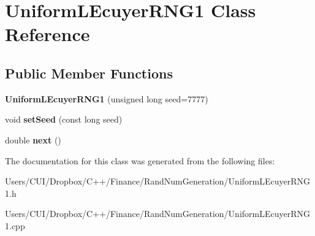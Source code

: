\hypertarget{class_uniform_l_ecuyer_r_n_g1}{}\section{Uniform\+L\+Ecuyer\+R\+N\+G1 Class Reference}
\label{class_uniform_l_ecuyer_r_n_g1}
\subsection*{Public Member Functions}
\begin{DoxyCompactItemize}
\item 
\hypertarget{class_uniform_l_ecuyer_r_n_g1_a337fc3fe276e950c8ef9e330779eedb7}{}\label{class_uniform_l_ecuyer_r_n_g1_a337fc3fe276e950c8ef9e330779eedb7} 
{\bfseries Uniform\+L\+Ecuyer\+R\+N\+G1} (unsigned long seed=7777)
\item 
\hypertarget{class_uniform_l_ecuyer_r_n_g1_a33e1ea51eb633a14e84d45d8c31a4e8b}{}\label{class_uniform_l_ecuyer_r_n_g1_a33e1ea51eb633a14e84d45d8c31a4e8b} 
void {\bfseries set\+Seed} (const long seed)
\item 
\hypertarget{class_uniform_l_ecuyer_r_n_g1_a6a166e0bef412d4c85565ec0017ae489}{}\label{class_uniform_l_ecuyer_r_n_g1_a6a166e0bef412d4c85565ec0017ae489} 
double {\bfseries next} ()
\end{DoxyCompactItemize}


The documentation for this class was generated from the following files\+:\begin{DoxyCompactItemize}
\item 
Users/\+C\+U\+I/\+Dropbox/\+C++/\+Finance/\+Rand\+Num\+Generation/Uniform\+L\+Ecuyer\+R\+N\+G1.\+h\item 
Users/\+C\+U\+I/\+Dropbox/\+C++/\+Finance/\+Rand\+Num\+Generation/Uniform\+L\+Ecuyer\+R\+N\+G1.\+cpp\end{DoxyCompactItemize}
